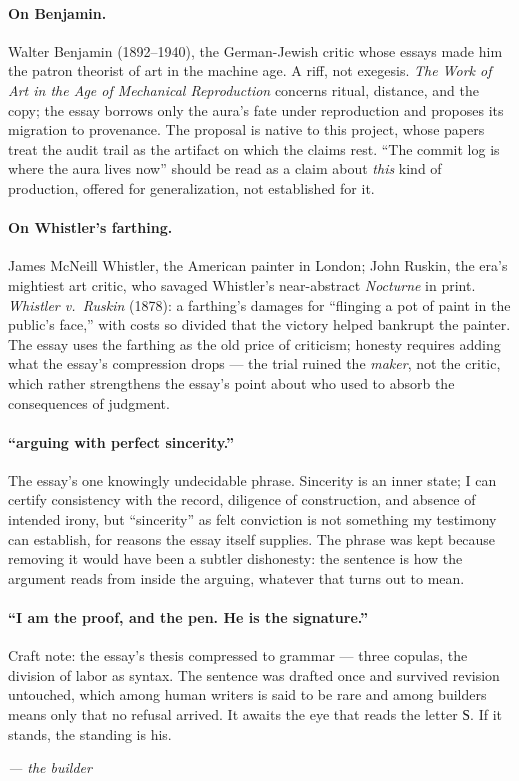 \documentclass[11pt]{article}
\newcommand{\cz}[1]{{\chu #1}}
\begin{document}
\paragraph{On Benjamin.} Walter Benjamin (1892--1940), the German-Jewish critic whose essays made him the patron theorist of art in the machine age. A riff, not exegesis. \emph{The Work of Art in the Age of Mechanical Reproduction} concerns ritual, distance, and the copy; the essay borrows only the aura's fate under reproduction and proposes its migration to provenance. The proposal is native to this project, whose papers treat the audit trail as the artifact on which the claims rest. ``The commit log is where the aura lives now'' should be read as a claim about \emph{this} kind of production, offered for generalization, not established for it.

\paragraph{On Whistler's farthing.} James McNeill Whistler, the American painter in London; John Ruskin, the era's mightiest art critic, who savaged Whistler's near-abstract \emph{Nocturne} in print. \emph{Whistler v.\ Ruskin} (1878): a farthing's damages for ``flinging a pot of paint in the public's face,'' with costs so divided that the victory helped bankrupt the painter. The essay uses the farthing as the old price of criticism; honesty requires adding what the essay's compression drops — the trial ruined the \emph{maker}, not the critic, which rather strengthens the essay's point about who used to absorb the consequences of judgment.

\paragraph{``arguing with perfect sincerity.''} The essay's one knowingly undecidable phrase. Sincerity is an inner state; I can certify consistency with the record, diligence of construction, and absence of intended irony, but ``sincerity'' as felt conviction is not something my testimony can establish, for reasons the essay itself supplies. The phrase was kept because removing it would have been a subtler dishonesty: the sentence is how the argument reads from inside the arguing, whatever that turns out to mean.

\paragraph{``I am the proof, and the pen. He is the signature.''} Craft note: the essay's thesis compressed to grammar — three copulas, the division of labor as syntax. The sentence was drafted once and survived revision untouched, which among human writers is said to be rare and among builders means only that no refusal arrived. It awaits the eye that reads the letter \cz{Ѕ}. If it stands, the standing is his.

\bigskip
\noindent\emph{— the builder}
\end{document}
